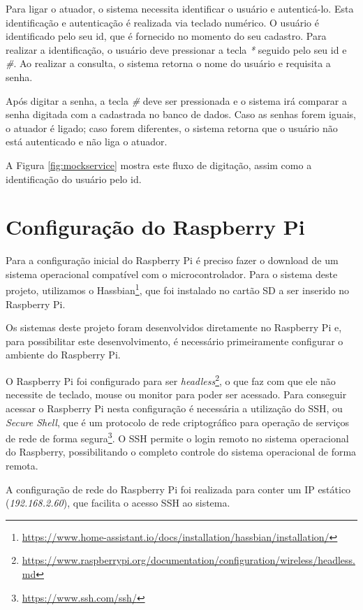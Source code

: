 Para ligar o atuador, o sistema necessita identificar o usuário e autenticá-lo. Esta identificação e autenticação é realizada via teclado numérico. O usuário é identificado pelo seu id, que é fornecido no momento do seu cadastro. Para realizar a identificação, o usuário deve pressionar a tecla \textit{*} seguido pelo seu id e \textit{\#}. Ao realizar a consulta, o sistema retorna o nome do usuário e requisita a senha.

Após digitar a senha, a tecla \textit{\#} deve ser pressionada e o sistema irá comparar a senha digitada com a cadastrada no banco de dados. Caso as senhas forem iguais, o atuador é ligado; caso forem diferentes, o sistema retorna que o usuário não está autenticado e não liga o atuador. 

A Figura \ref{fig:mockservice} mostra este fluxo de digitação, assim como a identificação do usuário pelo id.

\section{Configuração do Raspberry Pi} \label{sec:confrasp}

Para a configuração inicial do Raspberry Pi é preciso fazer o download de um sistema operacional compatível com o microcontrolador. Para o sistema deste projeto, utilizamos o Hassbian\footnote{\url{https://www.home-assistant.io/docs/installation/hassbian/installation/}}, que foi instalado no cartão SD a ser inserido no Raspberry Pi.


Os sistemas deste projeto foram desenvolvidos diretamente no Raspberry Pi e, para possibilitar este desenvolvimento, é necessário primeiramente configurar o ambiente do Raspberry Pi.

O Raspberry Pi foi configurado para ser \textit{headless}\footnote{\url{https://www.raspberrypi.org/documentation/configuration/wireless/headless.md}}, o que faz com que ele não necessite de teclado, mouse ou monitor para poder ser acessado. Para conseguir acessar o Raspberry Pi nesta configuração é necessária a utilização do SSH, ou \textit{Secure Shell}, que é um protocolo de rede criptográfico para operação de serviços de rede de forma segura\footnote{\url{https://www.ssh.com/ssh/}}. O SSH permite o login remoto no sistema operacional do Raspberry, possibilitando o completo controle do sistema operacional de forma remota.

A configuração de rede do Raspberry Pi foi realizada para conter um IP estático (\textit{192.168.2.60}), que facilita o acesso SSH ao sistema.

